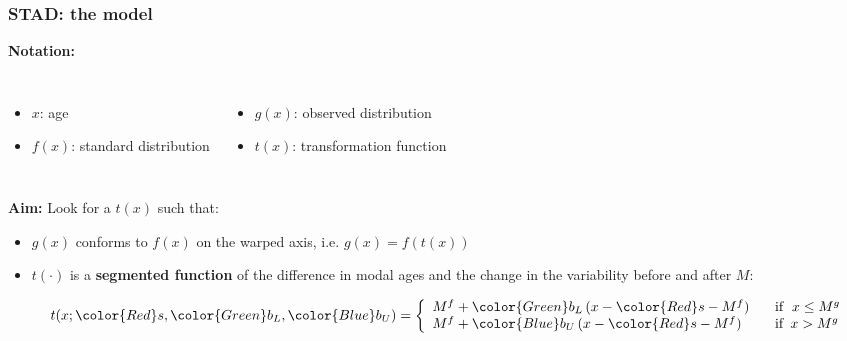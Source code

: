 \documentclass[12pt, xcolor=table]{beamer}  %
\begin{document}
\begin{frame}[noframenumbering]\frametitle{STAD: the model}
	
	\textbf{Notation:}
	
	\begin{columns}
		\begin{itemize}
			\item $x$: age 
			\item $f(x)$: standard distribution			
		\end{itemize}
		\begin{itemize}
			\item $g(x)$: observed distribution	 
			\item $t(x)$: transformation function		
			
		\end{itemize}		
	\end{columns}
	
	\bigskip 
	\bigskip
	
	\textbf{Aim:} Look for a $t(x)$ such that: 
	
	\begin{itemize}
		\item $g(x)$ conforms to $f(x)$ on the warped axis, i.e. $g(x) = f(t(x))$ 
		
		\item $t(\cdot)$ is a \textbf{segmented function} of the difference in modal ages and the change in the variability before and after $M$:
		
		
		\vspace{-0.4cm}
		
		\begin{equation*}\label{eqtx}
			t(x;{\color{Red}s},{\color{Green} b_{L}},{\color{Blue}
				b_{U}}) = \left\{ 
			\begin{array}{ll}
				M^{f} + {\color{Green} b_{L}}\, (x - {\color{Red}s} - M^{f}) \;\;\; & \mathrm{if} \; \; x \leq M^{g} \\
				M^{f} + {\color{Blue} b_{U}}\, (x - {\color{Red}s} - M^{f})  \;\;\; & \mathrm{if} \; \, x >  M^{g} \\
			\end{array}
			\right.
		\end{equation*}	
		
	\end{itemize}
	
\end{frame}
\end{document}
